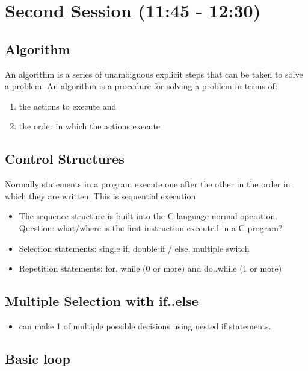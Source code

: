 \documentclass[11pt]{article}
\begin{document}
\section{Second Session (11:45 - 12:30)}
\label{sec-2}
\subsection{Algorithm}
\label{sec-2-1}

An algorithm is a series of unambiguous explicit steps that can be taken to solve a problem.
An algorithm is a procedure for solving a problem in terms of:

\begin{enumerate}
\item the actions to execute and
\item the order in which the actions execute
\end{enumerate}
\subsection{Control Structures}
\label{sec-2-2}

Normally statements in a program execute one after the other in the
order in which they are written.  This is sequential execution.

\begin{itemize}
\item The sequence structure is built into the C language normal operation.
  Question: what/where is the first instruction executed in a C program?
\item Selection statements: single if, double if / else, multiple switch
\item Repetition statements: for, while (0 or more) and do..while (1 or more)
\end{itemize}
\subsection{Multiple Selection with if..else}
\label{sec-2-3}

\begin{itemize}
\item can make 1 of multiple possible decisions using nested if statements.
\end{itemize}
\subsection{Basic loop}
\label{sec-2-4}
\end{document}
